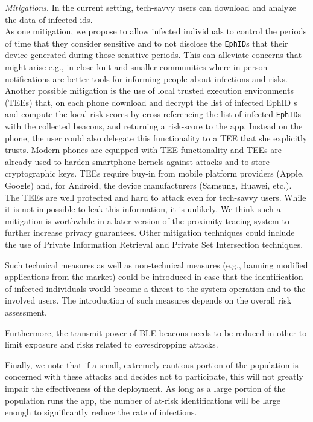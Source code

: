 \documentclass[12pt,a4paper]{article}
\begin{document}
\textit{Mitigations}. In the current setting, tech-savvy users can download and analyze the data of infected ids.\\
As one mitigation, we propose to allow infected individuals to control the periods of time that they consider sensitive and to not disclose the \texttt{EphID}s that their device generated during those sensitive periods. This can alleviate concerns that might arise e.g., in close-knit and  smaller communities where in person notifications are better tools for informing people about infections and risks.\\
Another possible mitigation is the use of local trusted execution environments (TEEs) that, on each phone download and decrypt the list of infected EphID s and compute the local risk scores by cross referencing the list of infected \texttt{EphID}s with the collected beacons, and returning a risk-score to the app. Instead on the phone, the user could also delegate this functionality to a TEE that she explicitly trusts. Modern phones are equipped with TEE functionality and TEEs are already used to harden smartphone kernels against attacks and to store cryptographic keys. TEEs require buy-in from mobile platform providers (Apple, Google) and, for Android, the device manufacturers (Samsung, Huawei, etc.). The TEEs are well protected and hard to attack even for tech-savvy users. While it is not impossible to leak this information, it is unlikely. We think such a mitigation is worthwhile in a later version of the proximity tracing system to further increase privacy guarantees. Other mitigation techniques could include the use of Private Information Retrieval and Private Set Intersection techniques.

Such technical measures as well as non-technical measures (e.g., banning modified
applications from the market) could be introduced in case that the identification of infected individuals would become a threat to the system operation and to the involved users. The introduction of such measures depends on the overall risk assessment.

Furthermore, the transmit power of BLE beacons needs to be reduced in other to limit
exposure and risks related to eavesdropping attacks.

Finally, we note that if a small, extremely cautious portion of the population is concerned with these attacks and decides not to participate, this will not greatly impair the effectiveness of the deployment. As long as a large portion of the population runs the app, the number of at-risk identifications will be large enough to significantly reduce the rate of infections.
\end{document}
